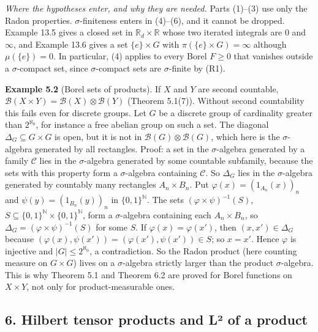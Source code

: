 \documentclass[
  english,
  11pt,
  a4paper,
]{article}
\begin{document}
\emph{Where the hypotheses enter, and why they are needed.} Parts
(1)--(3) use only the Radon properties. \(\sigma\)-finiteness enters in
(4)--(6), and it cannot be dropped. Example 13.5 gives a closed set in
\(\mathbb R_d\times\mathbb R\) whose two iterated integrals are \(0\)
and \(\infty\), and Example 13.6 gives a set \(\{e\}\times G\) with
\(\pi(\{e\}\times G)=\infty\) although \(\mu(\{e\})=0\). In particular,
(4) applies to every Borel \(F\geq0\) that vanishes outside a
\(\sigma\)-compact set, since \(\sigma\)-compact sets are
\(\sigma\)-finite by (R1).

\textbf{Example 5.2} (Borel sets of products). If \(X\) and \(Y\) are
second countable,
\(\mathcal B(X\times Y)=\mathcal B(X)\otimes\mathcal B(Y)\) (Theorem
5.1(7)). Without second countability this fails even for discrete
groups. Let \(G\) be a discrete group of cardinality greater than
\(2^{\aleph_0}\), for instance a free abelian group on such a set. The
diagonal \(\Delta_G\subseteq G\times G\) is open, but it is not in
\(\mathcal B(G)\otimes\mathcal B(G)\), which here is the
\(\sigma\)-algebra generated by all rectangles. Proof: a set in the
\(\sigma\)-algebra generated by a family \(\mathcal C\) lies in the
\(\sigma\)-algebra generated by some countable subfamily, because the
sets with this property form a \(\sigma\)-algebra containing
\(\mathcal C\). So \(\Delta_G\) lies in the \(\sigma\)-algebra generated
by countably many rectangles \(A_n\times B_n\). Put
\(\varphi(x)=(1_{A_n}(x))_n\) and \(\psi(y)=(1_{B_n}(y))_n\) in
\(\{0,1\}^{\mathbb N}\). The sets \((\varphi\times\psi)^{-1}(S)\),
\(S\subseteq\{0,1\}^{\mathbb N}\times\{0,1\}^{\mathbb N}\), form a
\(\sigma\)-algebra containing each \(A_n\times B_n\), so
\(\Delta_G=(\varphi\times\psi)^{-1}(S)\) for some \(S\). If
\(\varphi(x)=\varphi(x')\), then \((x,x')\in\Delta_G\) because
\((\varphi(x),\psi(x'))=(\varphi(x'),\psi(x'))\in S\); so \(x=x'\).
Hence \(\varphi\) is injective and \(|G|\leq2^{\aleph_0}\), a
contradiction. So the Radon product (here counting measure on
\(G\times G\)) lives on a \(\sigma\)-algebra strictly larger than the
product \(\sigma\)-algebra. This is why Theorem 5.1 and Theorem 6.2 are
proved for Borel functions on \(X\times Y\), not only for
product-measurable ones.

\subsection[6. Hilbert tensor products and L² of a
product]{\texorpdfstring{\protect\hypertarget{haar-measure-on-locally-compact-groups--oa-fnd-hm-11}{}{}6.
Hilbert tensor products and L² of a
product}{6. Hilbert tensor products and L² of a product}}\label{haar-measure-on-locally-compact-groups--OA-FND-HM-11}
\end{document}
